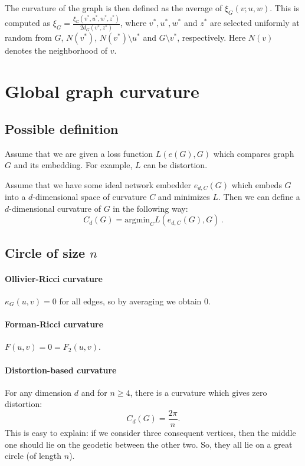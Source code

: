 \documentclass{article}
\begin{document}
The curvature of the graph is then defined as the average of $\xi_G(v; u,w)$. This is computed as $\xi_G = \frac{\xi_G(v^\ast,u^\ast,w^\ast,z^\ast)}{2d_G(v^\ast,z^\ast)}$, where $v^\ast, u^\ast, w^\ast$ and $z^\ast$ are selected uniformly at random from $G$, $N(v^\ast)$, $N(v^\ast)\setminus u^\ast$ and $G\setminus v^\ast$, respectively. Here $N(v)$ denotes the neighborhood of $v$.



\section{Global graph curvature}

\subsection{Possible definition}
        
Assume that we are given a loss function $L(e(G),G)$ which compares graph $G$ and its embedding. For example, $L$ can be distortion.

Assume that we have some ideal network embedder $e_{d,C}(G)$ which embeds $G$ into a $d$-dimensional space of curvature $C$ and minimizes $L$. Then we can define a $d$-dimensional curvature of $G$ in the following way:
\[
C_d(G) = \textrm{argmin}_C L(e_{d,C}(G),G)\,.
\]

\subsection{Circle of size $n$}
                     
\paragraph{Ollivier-Ricci curvature} $\kappa_G(u,v) = 0$ for all edges, so by averaging we obtain $0$.

\paragraph{Forman-Ricci curvature} $F(u,v) = 0 = F_2(u,v)$.

\paragraph{Distortion-based curvature} For any dimension $d$ and for $n \ge 4$, there is a curvature which gives zero distortion:
\[
C_d(G) = \frac{2\pi}{n}.
\]
This is easy to explain: if we consider three consequent vertices, then the middle one should lie on the geodetic between the other two. So, they all lie on a great circle (of length $n$).
\end{document}

